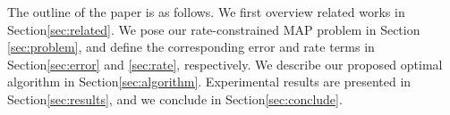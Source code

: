 The outline of the paper is as follows. 
We first overview related works in Section\;\ref{sec:related}. 
We pose our rate-constrained MAP problem in Section \ref{sec:problem}, and define the corresponding error and rate terms in Section\;\ref{sec:error} and \ref{sec:rate}, respectively.
We describe our proposed optimal algorithm in Section\;\ref{sec:algorithm}. 
Experimental results are presented in Section\;\ref{sec:results}, and we conclude in Section\;\ref{sec:conclude}. 